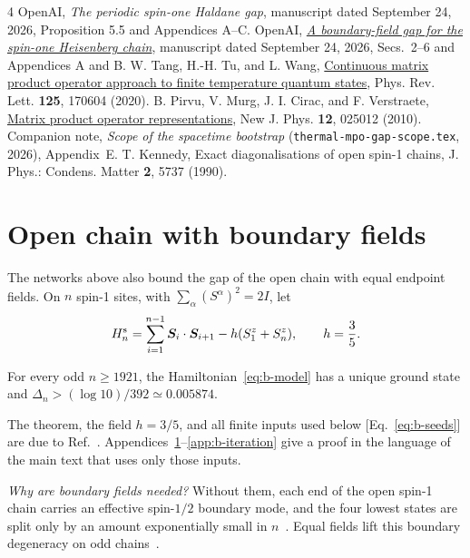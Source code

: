 \documentclass[aps,prl,reprint,amsmath,amssymb,nofootinbib,raggedbottom]{revtex4-2}
\begin{document}
\begin{thebibliography}{4}
OpenAI, \emph{The periodic spin-one Haldane gap}, manuscript dated
September 24, 2026, Proposition 5.5 and Appendices A--C.
OpenAI, \href{https://github.com/openai/math/blob/main/preprints/A-boundary-field-gap-for-the-spin-one-Heisenberg-chain-September-24-2026/paper.pdf}
{\emph{A boundary-field gap for the spin-one Heisenberg chain}},
manuscript dated September 24, 2026, Secs.~2--6 and Appendices A and B.
W. Tang, H.-H. Tu, and L. Wang,
\href{https://doi.org/10.1103/PhysRevLett.125.170604}
{Continuous matrix product operator approach to finite temperature quantum states},
Phys. Rev. Lett. \textbf{125}, 170604 (2020).
B. Pirvu, V. Murg, J. I. Cirac, and F. Verstraete,
\href{https://doi.org/10.1088/1367-2630/12/2/025012}
{Matrix product operator representations},
New J. Phys. \textbf{12}, 025012 (2010).
Companion note, \emph{Scope of the spacetime bootstrap}
(\texttt{thermal-mpo-gap-scope.tex}, 2026), Appendix~E.
T. Kennedy, Exact diagonalisations of open spin-1 chains,
J. Phys.: Condens. Matter \textbf{2}, 5737 (1990).
\end{thebibliography}

\clearpage
\appendix
\setcounter{secnumdepth}{2}
\section{Open chain with boundary fields}\label{app:open}
The networks above also bound the gap of the open chain with equal
endpoint fields. On $n$ spin-1 sites, with
$\sum_\alpha(S^\alpha)^2=2I$, let
\begin{equation}
 H_n^{\mathrm{s}}=\sum_{i=1}^{n-1}\bm S_i\cdot\bm S_{i+1}
       -h(S_1^z+S_n^z),\qquad h=\frac35.
 \label{eq:b-model}
\end{equation}
\begin{theorem}\label{thm:b-gap}
For every odd $n\ge1921$, the Hamiltonian~\eqref{eq:b-model} has a unique
ground state and $\Delta_n>(\log10)/392\simeq0.005874$.
\end{theorem}
The theorem, the field $h=3/5$, and all finite inputs used below
[Eq.~\eqref{eq:b-seeds}] are due to Ref.~\cite{boundary}. Appendices~\ref{app:open}--\ref{app:b-iteration} give
a proof in the language of the main text that uses only those inputs.

\emph{Why are boundary fields needed?} Without them, each end of the open
spin-1 chain carries an effective spin-$1/2$ boundary mode, and the four lowest
states are split only by an amount exponentially small in
$n$~\cite{kennedy}. Equal fields lift this boundary degeneracy on odd
chains~\cite{boundary}.
\end{document}
